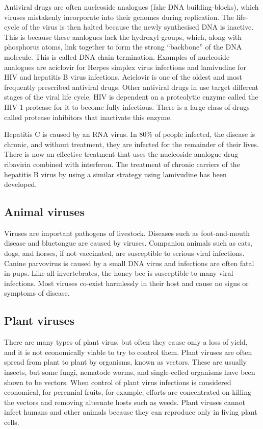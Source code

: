 Antiviral drugs are often nucleoside analogues (fake DNA building-blocks), which viruses mistakenly incorporate into their genomes during replication. The life-cycle of the virus is then halted because the newly synthesised DNA is inactive. This is because these analogues lack the hydroxyl groups, which, along with phosphorus atoms, link together to form the strong ``backbone'' of the DNA molecule. This is called DNA chain termination. Examples of nucleoside analogues are aciclovir for Herpes simplex virus infections and lamivudine for HIV and hepatitis B virus infections. Aciclovir is one of the oldest and most frequently prescribed antiviral drugs. Other antiviral drugs in use target different stages of the viral life cycle. HIV is dependent on a proteolytic enzyme called the HIV-1 protease for it to become fully infectious. There is a large class of drugs called protease inhibitors that inactivate this enzyme.

Hepatitis C is caused by an RNA virus. In 80\% of people infected, the disease is chronic, and without treatment, they are infected for the remainder of their lives. There is now an effective treatment that uses the nucleoside analogue drug ribavirin combined with interferon. The treatment of chronic carriers of the hepatitis B virus by using a similar strategy using lamivudine has been developed.

\hypertarget{animal-viruses}{%
\subsection{Animal viruses}\label{animal-viruses}}

Viruses are important pathogens of livestock. Diseases such as foot-and-mouth disease and bluetongue are caused by viruses. Companion animals such as cats, dogs, and horses, if not vaccinated, are susceptible to serious viral infections. Canine parvovirus is caused by a small DNA virus and infections are often fatal in pups. Like all invertebrates, the honey bee is susceptible to many viral infections. Most viruses co-exist harmlessly in their host and cause no signs or symptoms of disease.

\hypertarget{plant-viruses}{%
\subsection{Plant viruses}\label{plant-viruses}}

There are many types of plant virus, but often they cause only a loss of yield, and it is not economically viable to try to control them. Plant viruses are often spread from plant to plant by organisms, known as vectors. These are usually insects, but some fungi, nematode worms, and single-celled organisms have been shown to be vectors. When control of plant virus infections is considered economical, for perennial fruits, for example, efforts are concentrated on killing the vectors and removing alternate hosts such as weeds. Plant viruses cannot infect humans and other animals because they can reproduce only in living plant cells.

